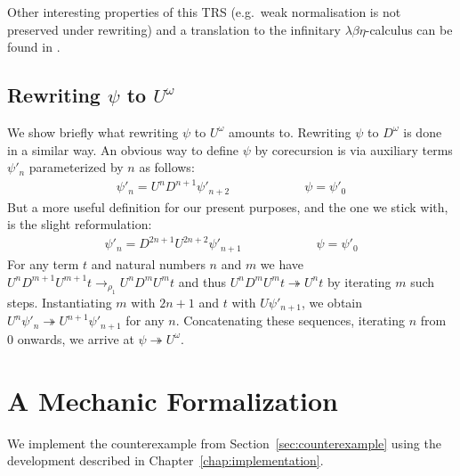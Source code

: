 Other interesting properties of this TRS (e.g.\ weak normalisation is
not preserved under rewriting) and a translation to the infinitary
$\lambda \beta \eta$-calculus can be found in \citet{endrullis-10}.


\subsection{\texorpdfstring{Rewriting $\psi$ to $U^\omega$}{Rewriting
    DUUDDD... to UUU...}}\label{sub:counterexample}

We show briefly what rewriting $\psi$ to $U^\omega$ amounts
to. Rewriting $\psi$ to $D^\omega$ is done in a similar way.
An obvious way to define $\psi$ by corecursion is via auxiliary terms
$\psi'_n$ parameterized by $n$ as follows:
\begin{align*}
  \psi'_n = U^n D^{n + 1} \psi'_{n + 2} \qquad \qquad \qquad
  \psi = \psi'_0
\end{align*}
But a more useful definition for our present purposes, and the one we
stick with, is the slight reformulation:
\begin{align*}
  \psi'_n = D^{2 n + 1} U^{2 n + 2} \psi'_{n + 1} \qquad
  \qquad \qquad
  \psi = \psi'_0
\end{align*}
For any term $t$ and natural numbers $n$ and $m$ we have $U^n D^{m+1}
U^{m+1} t \rightarrow_{\rho_1} U^n D^m U^m t$ and thus $U^n D^m U^m t
\twoheadrightarrow U^n t$ by iterating $m$ such steps. Instantiating
$m$ with $2 n + 1$ and $t$ with $U \psi'_{n + 1}$, we obtain
$U^n \psi'_n \twoheadrightarrow U^{n+1} \psi'_{n + 1}$ for any $n$.
Concatenating these sequences, iterating $n$ from $0$ onwards, we
arrive at $\psi \twoheadrightarrow U^\omega$.


\section{A Mechanic Formalization}

We implement the counterexample from Section~\ref{sec:counterexample}
using the \Coq development described in
Chapter~\ref{chap:implementation}.

